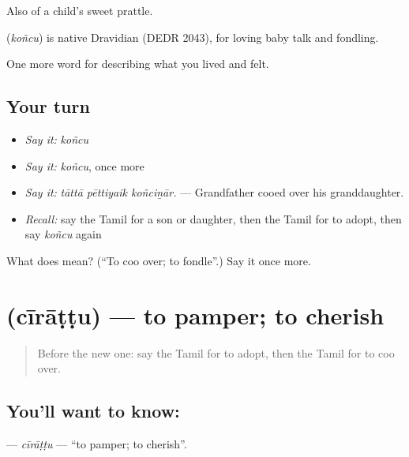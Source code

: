 Also of a child’s sweet prattle.

\begin{cousinweb}
\textbf{} (\emph{koñcu}) is native Dravidian (DEDR 2043), for loving baby talk and fondling.
\end{cousinweb}

\begin{grammarlens}[title={What you've built}]
One more word for describing what you lived and felt.
\end{grammarlens}

\subsection*{Your turn}
\begin{itemize}
\raggedright
  \item \emph{Say it:} \emph{koñcu}
  \item \emph{Say it:} \emph{koñcu}, once more
  \item \emph{Say it:} \emph{tāttā pēttiyaik koñciṉār.} — Grandfather cooed over his granddaughter.
  \item \emph{Recall:} say the Tamil for a son or daughter, then the Tamil for to adopt, then say \emph{koñcu} again
\end{itemize}

\begin{tcolorbox}[breakable,colback=teal!4,colframe=teal!35!black,title={Before you move on}]
What does  mean? (\textquotedblleft{}To coo over; to fondle\textquotedblright{}.) Say it once more.
\end{tcolorbox}
\section[\texorpdfstring{\ta{சீராட்டு} (cīrāṭṭu)}{சீராட்டு (cīrāṭṭu)}]{ (cīrāṭṭu) — to pamper; to cherish}

\label{lesson:TA-C497-cirattu}



\begin{quote}
Before the new one: say the Tamil for to adopt, then the Tamil for to coo over.
\end{quote}

\subsection*{You'll want to know: }
\textbf{} — \emph{cīrāṭṭu} — \textquotedblleft{}to pamper; to cherish\textquotedblright{}.

